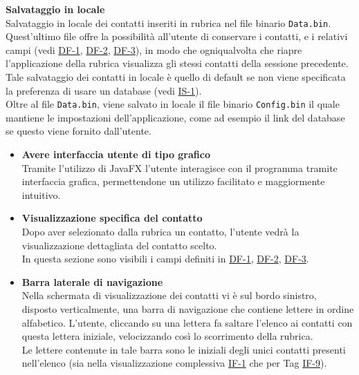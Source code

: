 \begin{tcolorbox}[colback=white,colframe=black!80!white,title=\textbf{Esigenze dei dati e informazioni DF}]
\begin{itemize}[itemsep=2pt, topsep=0pt]
		\hypertarget{DF-4}{\item[\textbf{DF-4}]} \textbf{Salvataggio in locale}
		\\Salvataggio in locale dei contatti inseriti in rubrica nel file binario \texttt{Data.bin}. Quest’ultimo file offre la possibilità all’utente di conservare i contatti, e i relativi campi (vedi \hyperlink{DF-1}{DF-1}, \hyperlink{DF-2}{DF-2}, \hyperlink{DF-3}{DF-3}), in modo che ogniqualvolta che riapre l’applicazione della rubrica visualizza gli stessi contatti della sessione precedente.
		\\Tale salvataggio dei contatti in locale è quello di default se non viene specificata la preferenza di usare un database (vedi \hyperlink{IS-1}{IS-1}).
		\\Oltre al file \texttt{Data.bin}, viene salvato in locale il file binario \texttt{Config.bin} il quale mantiene le impostazioni dell’applicazione, come ad esempio il link del database se questo viene fornito dall’utente.
		
	\end{itemize}
\end{tcolorbox}

\begin{tcolorbox}[colback=white,colframe=black!80!white,title=\textbf{Interfaccia Utente UI}]
	\begin{itemize}[itemsep=2pt, topsep=0pt]
		\item[\textbf{UI-1}] \textbf{Avere interfaccia utente di tipo grafico} 
		\\Tramite l’utilizzo di JavaFX l’utente interagisce con il programma tramite interfaccia grafica, permettendone un utilizzo facilitato e maggiormente intuitivo.
		
		\item[\textbf{UI-2}] \textbf{Visualizzazione specifica del contatto}
		\\Dopo aver selezionato dalla rubrica un contatto, l’utente vedrà la visualizzazione dettagliata del contatto scelto.
		\\In questa sezione sono visibili i campi definiti in \hyperlink{DF-1}{DF-1}, \hyperlink{DF-2}{DF-2}, \hyperlink{DF-3}{DF-3}.
		
		\item[\textbf{UI-3}] \textbf{Barra laterale di navigazione}
		\\Nella schermata di visualizzazione dei contatti vi è sul bordo sinistro, disposto verticalmente, una barra di navigazione che contiene lettere in ordine alfabetico. L’utente, cliccando su una lettera fa saltare l’elenco ai contatti con questa lettera iniziale, velocizzando così lo scorrimento della rubrica.
		\\Le lettere contenute in tale barra sono le iniziali degli unici contatti presenti nell’elenco (sia nella visualizzazione complessiva \hyperlink{IF-1}{IF-1} che per Tag \hyperlink{IF-9}{IF-9}).		
	\end{itemize}
\end{tcolorbox}

